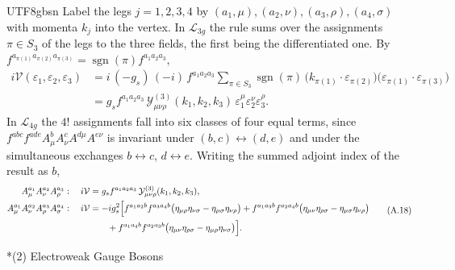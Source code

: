 \documentclass[11pt,a4paper,oneside]{report}
\makeatletter
\newcommand\topic{\@startsection{paragraph}{4}{\z@}{-1.7ex plus -.3ex}{.5ex}{\normalfont\normalsize\bfseries\itshape\boldmath}*}
\makeatother
\begin{document}
\begin{CJK*}{UTF8}{gbsn}
Label the legs $j=1,2,3,4$ by $(a_1,\mu),(a_2,\nu),(a_3,\rho),(a_4,\sigma)$ with momenta $k_j$ into the vertex. In $\mathcal L_{3g}$ the rule sums over the assignments $\pi\in S_3$ of the legs to the three fields, the first being the differentiated one. By $f^{a_{\pi(1)}a_{\pi(2)}a_{\pi(3)}}=\operatorname{sgn}(\pi)f^{a_1a_2a_3}$,
\begin{equation*}
\begin{aligned}
i\mathcal V(\varepsilon_1,\varepsilon_2,\varepsilon_3)
&=i\,(-g_s)\,(-i)\,f^{a_1a_2a_3}\sum_{\pi\in S_3}\operatorname{sgn}(\pi)\,\bigl(k_{\pi(1)}\cdot\varepsilon_{\pi(2)}\bigr)\bigl(\varepsilon_{\pi(1)}\cdot\varepsilon_{\pi(3)}\bigr)\\
&=g_sf^{a_1a_2a_3}\,\mathcal Y^{(3)}_{\mu\nu\rho}(k_1,k_2,k_3)\,\varepsilon_1^\mu\varepsilon_2^\nu\varepsilon_3^\rho .
\end{aligned}
\tag{A.17}\label{eq:A.17}
\end{equation*}
In $\mathcal L_{4g}$ the $4!$ assignments fall into six classes of four equal terms, since $f^{abc}f^{ade}A^b_\mu A^c_\nu A^{d\mu}A^{e\nu}$ is invariant under $(b,c)\leftrightarrow(d,e)$ and under the simultaneous exchanges $b\leftrightarrow c$, $d\leftrightarrow e$. Writing the summed adjoint index of the result as $b$,
\begin{equation*}
{\displaystyle 
\begin{aligned}
A^{a_1}_\mu A^{a_2}_\nu A^{a_3}_\rho:\quad i\mathcal V&=g_sf^{a_1a_2a_3}\,\mathcal Y^{(3)}_{\mu\nu\rho}(k_1,k_2,k_3),\\
A^{a_1}_\mu A^{a_2}_\nu A^{a_3}_\rho A^{a_4}_\sigma:\quad i\mathcal V&=-ig_s^2\Bigl[f^{a_1a_2b}f^{a_3a_4b}\bigl(\eta_{\mu\rho}\eta_{\nu\sigma}-\eta_{\mu\sigma}\eta_{\nu\rho}\bigr)
+f^{a_1a_3b}f^{a_2a_4b}\bigl(\eta_{\mu\nu}\eta_{\rho\sigma}-\eta_{\mu\sigma}\eta_{\nu\rho}\bigr)\\
&\qquad+f^{a_1a_4b}f^{a_2a_3b}\bigl(\eta_{\mu\nu}\eta_{\rho\sigma}-\eta_{\mu\rho}\eta_{\nu\sigma}\bigr)\Bigr].
\end{aligned}}
\tag{A.18}\label{eq:A.18}
\end{equation*}

\topic{(2) Electroweak Gauge Bosons}


\end{CJK*}
\end{document}
